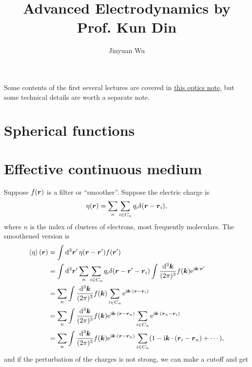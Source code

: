 \documentclass[hyperref, a4paper]{article}
\title{Advanced Electrodynamics by Prof. Kun Din}
\author{Jinyuan Wu}
\newcommand*{\ii}{\mathrm{i}}
\newcommand*{\ee}{\mathrm{e}}
\newcommand{\opticsdoc}{\href{../optics/optics.pdf}{this optics note}}
\begin{document}
\maketitle

Some contents of the first several lectures are covered in \opticsdoc,
but some technical details are worth a separate note.

\section{Spherical functions}

\section{Effective continuous medium}

Suppose $f(\vb*{r})$ is a filter or ``smoother''. Suppose the electric charge is 
\begin{equation}
    \eta(\vb*{r}) = \sum_n \sum_{i \in C_n} q_i \delta(\vb*{r} - \vb*{r}_i),
\end{equation}
where $n$ is the index of clusters of electrons, most frequently moleculars. The smoothened version is 
\[
    \begin{aligned}
        \expval{\eta}(\vb*{r}) &= \int \dd[3]{\vb*{r}'} \eta(\vb*{r} - \vb*{r}') f(\vb*{r}') \\
        &= \int \dd[3]{\vb*{r}'} \sum_n \sum_{i \in C_n} q_i \delta(\vb*{r} - \vb*{r}' - \vb*{r}_i) 
        \int \frac{\dd[3]{\vb*{k}}}{(2\pi)^3} f(\vb*{k}) \ee^{\ii \vb*{k} \cdot \vb*{r}'} \\
        &= \sum_n \int \frac{\dd[3]{\vb*{k}}}{(2\pi)^3} f(\vb*{k}) \sum_{i \in C_n} \ee^{\ii \vb*{k} \cdot (\vb*{r} - \vb*{r}_i)} \\
        &= \sum_n \int \frac{\dd[3]{\vb*{k}}}{(2\pi)^3} f(\vb*{k}) \ee^{\ii \vb*{k} \cdot (\vb*{r} - \vb*{r}_n)} \sum_{i \in C_n} \ee^{\ii \vb*{k} \cdot (\vb*{r}_n - \vb*{r}_i)} \\
        &= \sum_n \int \frac{\dd[3]{\vb*{k}}}{(2\pi)^3} f(\vb*{k}) \ee^{\ii \vb*{k} \cdot (\vb*{r} - \vb*{r}_n)} \sum_{i \in C_n} (1 - \ii \vb*{k} \cdot (\vb*{r}_i - \vb*{r}_n) + \cdots),
    \end{aligned}
\]
and if the perturbation of the charges is not strong, we can make a cutoff and get 
\end{document}
